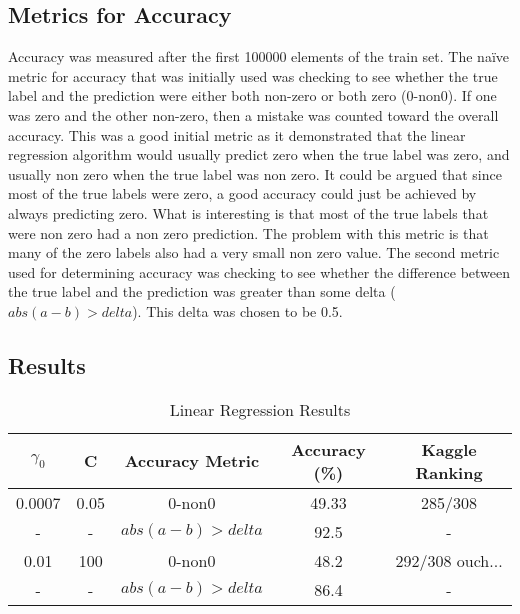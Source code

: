 \documentclass[pdftex,a4paper,12pt]{article}
\begin{document}
\subsection{Metrics for Accuracy}
Accuracy was measured after the first 100000 elements of the train set. The na{\"i}ve metric for accuracy that was initially used was checking to see whether the true label and the prediction were either both non-zero or both zero (0-non0). If one was zero and the other non-zero, then a mistake was counted toward the overall accuracy. This was a good initial metric as it demonstrated that the linear regression algorithm would usually predict zero when the true label was zero, and usually non zero when the true label was non zero. It could be argued that since most of the true labels were zero, a good accuracy could just be achieved by always predicting zero. What is interesting is that most of the true labels that were non zero had a non zero prediction. The problem with this metric is that many of the zero labels also had a very small non zero value. The second metric used for determining accuracy was checking to see whether the difference between the true label and the prediction was greater than some delta ($abs(a - b) > delta$). This delta was chosen to be 0.5.
\subsection{Results}
  \begin{table}[h]
        {\centering
          \begin{tabular}{|c|c|c|c|c|}
            \hline
             $\gamma_0$ & C & Accuracy Metric & Accuracy (\%) & Kaggle Ranking\\
            \hline
                0.0007 &   0.05        & 0-non0 & 49.33 & 285/308  \\
             \hline
                - &   -        & $abs(a - b) > delta$ & 92.5 & - \\
                  \hline
                0.01 &  100         &  0-non0  & 48.2 & 292/308   ouch... \\
          \hline
                - &  -         & $abs(a - b) > delta$ & 86.4 & - \\
             \hline
          \end{tabular}
          \caption{Linear Regression Results}          
          \label{table:linAcc}}
  \end{table}
\end{document}
